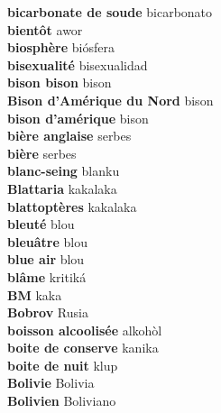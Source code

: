 \textbf{ bicarbonate de soude  } bicarbonato \\
\textbf{ bientôt  } awor \\
\textbf{ biosphère  } biósfera \\
\textbf{ bisexualité  } bisexualidad \\
\textbf{ bison bison  } bison \\
\textbf{ Bison d’Amérique du Nord  } bison \\
\textbf{ bison d’amérique  } bison \\
\textbf{ bière anglaise  } serbes \\
\textbf{ bière  } serbes \\
\textbf{ blanc-seing  } blanku \\
\textbf{ Blattaria  } kakalaka \\
\textbf{ blattoptères  } kakalaka \\
\textbf{ bleuté  } blou \\
\textbf{ bleuâtre  } blou \\
\textbf{ blue air  } blou \\
\textbf{ blâme  } kritiká \\
\textbf{ BM  } kaka \\
\textbf{ Bobrov  } Rusia \\
\textbf{ boisson alcoolisée  } alkohòl \\
\textbf{ boite de conserve  } kanika \\
\textbf{ boite de nuit  } klup \\
\textbf{ Bolivie  } Bolivia \\
\textbf{ Bolivien  } Boliviano \\
